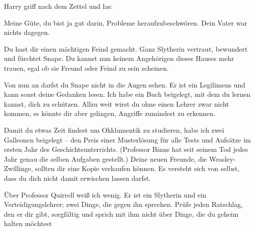 Harry griff nach dem Zettel und las:

\begin{writtenNote}
Meine Güte, du bist ja gut darin, Probleme heraufzubeschwören. Dein Vater war nichts dagegen.

Du hast dir einen mächtigen Feind gemacht. Ganz Slytherin vertraut, bewundert und fürchtet Snape. Du kannst nun keinem Angehörigen dieses Hauses mehr trauen, egal ob sie Freund oder Feind zu sein scheinen.

Von nun an darfst du Snape nicht in die Augen sehen. Er ist ein Legilimens und kann sonst deine Gedanken lesen. Ich habe ein Buch beigelegt, mit dem du lernen kannst, dich zu schützen. Allzu weit wirst du ohne einen Lehrer zwar nicht kommen, es könnte dir aber gelingen, Angriffe zumindest zu erkennen.

Damit du etwas Zeit findest um Okklumentik zu studieren, habe ich zwei Galleonen beigelegt – den Preis einer Musterlösung für alle Tests und Aufsätze im ersten Jahr des Geschichtsunterrichts. (Professor Binns hat seit seinem Tod jedes Jahr genau die selben Aufgaben gestellt.) Deine neuen Freunde, die Weasley-Zwillinge, sollten dir eine Kopie verkaufen können. Es versteht sich von selbst, dass du dich nicht damit erwischen lassen darfst.

Über Professor Quirrell weiß ich wenig. Er ist ein Slytherin und ein Verteidigungslehrer; zwei Dinge, die gegen ihn sprechen. Prüfe jeden Ratschlag, den er dir gibt, sorgfältig und sprich mit ihm nicht über Dinge, die du geheim halten möchtest


\end{writtenNote}
